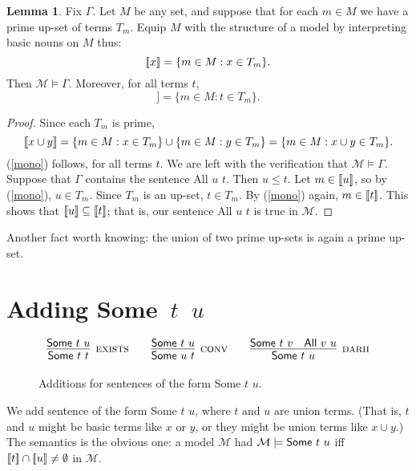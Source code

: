 \documentclass[12pt]{article}
\theoremstyle{definition}
\newtheorem{lemma}[theorem]{Lemma}
\newcommand{\semantics}[1]{[\![\mbox{\em $ #1 $\/}]\!]}
\newcommand{\Model}{\mathcal{M}}
\newcommand{\set}[1]{\{ #1 \}}
\newlength{\mathfrwidth}
\newenvironment{mathframe}
    {\begin{lrbox}{\mathfrbox}\begin{minipage}{\mathfrwidth}\begin{center}}
    {\end{center}\end{minipage}\end{lrbox}\noindent\fbox{\usebox{\mathfrbox}}}
\begin{document}
\begin{lemma} 
Fix $\Gamma$.
Let $M$ be any set, and suppose that for each $m\in M$ we have a prime up-set of terms $T_m$. 
Equip $M$ with the structure of a model by  interpreting 
basic nouns on $M$ thus:
 \[
 \semantics{x} = \set{m\in M : x \in T_m }.
 \]
 Then $\Model\models\Gamma$.   Moreover, for all terms $t$, 
  \begin{equation}
  \semantics{t} = \set{m\in M : t \in T_m }.
  \label{mono}
    \end{equation}
 \end{lemma}
 
 \begin{proof}
Since each $T_m$ is prime, 
 \[
 \semantics{x\cup y} =  \set{m\in M : x \in T_m }\cup\set{m\in M : y \in T_m } = \set{m\in M : x\cup y  \in T_m }.
 \]
 (\ref{mono}) follows, for all terms $t$.
 We are left with the verification that $\Model\models\Gamma$.
 Suppose that $\Gamma$ contains the sentence {\sf All $u$ $t$}.  
 Then $u \leq t$.
 Let $m\in \semantics{u}$, so by (\ref{mono}), $u\in T_m$.
 Since $T_m$ is an up-set, $t\in T_m$.    By (\ref{mono}) again, $m\in \semantics{t}$.  This shows that 
$\semantics{u} \subseteq \semantics{t}$; that is, our sentence  {\sf All $u$ $t$}  is true in $\Model$. 
 \end{proof}
 
 Another fact worth knowing: the union of two prime up-sets is again a prime up-set.
 
 \section{Adding \mbox{\sf Some $t$ $u$}}
 
 \begin{figure}[t]
\begin{mathframe}
\[
\begin{array}{l@{\qquad}l@{\qquad}l}
\infer[\mbox{\sc exists}]{\mbox{\sf Some $t$ $t$}}{\mbox{\sf Some $t$ $u$}}
&
\infer[\mbox{\sc conv}]{\mbox{\sf Some $u$ $t$}}{\mbox{\sf Some $t$ $u$}}
&
\infer[\mbox{\sc darii}]{\mbox{\sf Some $t$ $u$}}{\mbox{\sf Some $t$ $v$} & \mbox{\sf All $v$ $u$}}
\end{array}
\]
\caption{Additions for sentences of the form {\sf Some $t$ $u$}.\label{fig-adding-some}}
\end{mathframe}
\end{figure}

 We add sentence of the form  {\sf Some $t$ $u$}, where $t$ and $u$
 are union terms.  (That is, $t$ and $u$ might be basic terms like $x$ or $y$, or they
 might be union terms like $x\cup y$.)
 The semantics is the obvious one: a model $\Model$ had $\Model\models\mbox{\sf Some $t$ $u$}$
 iff $\semantics{t} \cap \semantics{u} \neq \emptyset$ in $\Model$.
 
\end{document}

